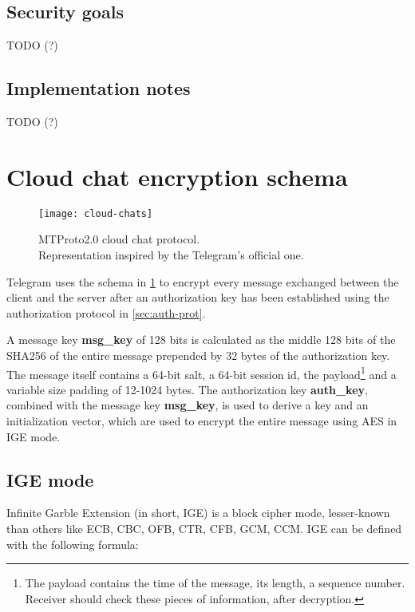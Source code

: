 \subsection{Security goals}
TODO (?)

\subsection{Implementation notes}
TODO (?)








\section{Cloud chat encryption schema}
\label{sec:cloud-chat}

\begin{figure}[t]
    \centering
    \texttt{[image: cloud-chats]}
    \caption{MTProto2.0 cloud chat protocol.\\Representation inspired by the Telegram's official one.}
    \label{fig:cloud-chat-protocol}
    \end{figure}

Telegram uses the schema in \cref{fig:cloud-chat-protocol} to encrypt every message exchanged between the client and the server after an authorization key has been established using the authorization protocol in \cref{sec:auth-prot}.

A message key \textbf{msg\_key} of 128 bits is calculated as the middle 128 bits of the SHA256 of the entire message prepended by 32 bytes of the authorization key. The message itself contains a 64-bit salt, a 64-bit session id, the payload\footnote{The payload contains the time of the message, its length, a sequence number. Receiver should check these pieces of information, after decryption.} and a variable size padding of 12-1024 bytes.
The authorization key \textbf{auth\_key}, combined with the message key \textbf{msg\_key}, is used to derive a key and an initialization vector, which are used to encrypt the entire message using AES in IGE mode.

\subsection{IGE mode}
Infinite Garble Extension (in short, IGE) is a block cipher mode, lesser-known than others like ECB, CBC, OFB, CTR, CFB, GCM, CCM.
IGE can be defined with the following formula:

